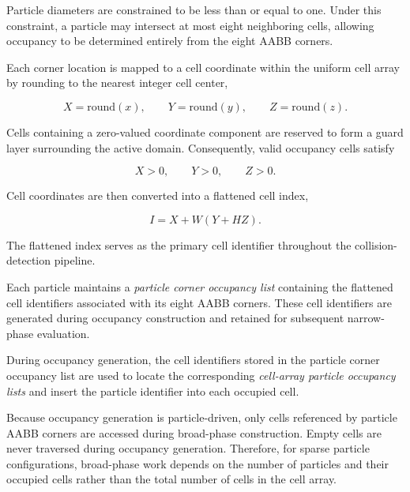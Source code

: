 Particle diameters are constrained to be less than or equal to one.
Under this constraint, a particle may intersect at most eight
neighboring cells, allowing occupancy to be determined entirely from
the eight AABB corners.

Each corner location is mapped to a cell coordinate within the uniform
cell array by rounding to the nearest integer cell center,

\begin{equation}
X = \mathrm{round}(x),\qquad Y = \mathrm{round}(y),\qquad Z = \mathrm{round}(z).
\end{equation}

Cells containing a zero-valued coordinate component are reserved to
form a guard layer surrounding the active domain. Consequently, valid
occupancy cells satisfy

\begin{equation}
X>0,\qquad Y>0,\qquad Z>0.
\end{equation}

Cell coordinates are then converted into a flattened cell index,

\begin{equation}
I = X + W(Y + HZ).
\end{equation}

The flattened index serves as the primary cell identifier throughout
the collision-detection pipeline.

Each particle maintains a \emph{particle corner occupancy list} containing the flattened cell identifiers associated with its eight AABB corners. These cell identifiers are generated during occupancy construction and retained for subsequent narrow-phase evaluation.

During occupancy generation, the cell identifiers stored in the particle
corner occupancy list are used to locate the corresponding \emph{cell-array particle occupancy lists} and insert the particle identifier into each occupied cell.

Because occupancy generation is particle-driven, only cells referenced
by particle AABB corners are accessed during broad-phase construction.
Empty cells are never traversed during occupancy generation. Therefore,
for sparse particle configurations, broad-phase work depends on the
number of particles and their occupied cells rather than the total
number of cells in the cell array.

